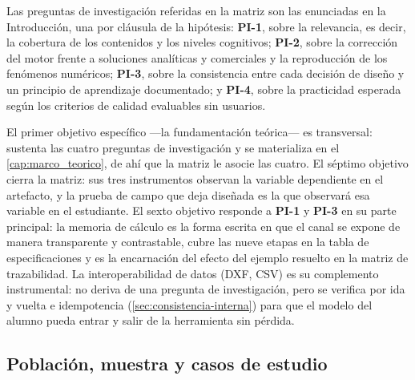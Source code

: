 Las preguntas de investigación referidas en la matriz son las enunciadas en la Introducción, una por cláusula de la hipótesis: \textbf{PI-1}, sobre la relevancia, es decir, la cobertura de los contenidos y los niveles cognitivos; \textbf{PI-2}, sobre la corrección del motor frente a soluciones analíticas y comerciales y la reproducción de los fenómenos numéricos; \textbf{PI-3}, sobre la consistencia entre cada decisión de diseño y un principio de aprendizaje documentado; y \textbf{PI-4}, sobre la practicidad esperada según los criterios de calidad evaluables sin usuarios.

El primer objetivo específico —la fundamentación teórica— es transversal: sustenta las cuatro preguntas de investigación y se materializa en el \autoref{cap:marco_teorico}, de ahí que la matriz le asocie las cuatro. El séptimo objetivo cierra la matriz: sus tres instrumentos observan la variable dependiente en el artefacto, y la prueba de campo que deja diseñada es la que observará esa variable en el estudiante. El sexto objetivo responde a \textbf{PI-1} y \textbf{PI-3} en su parte principal: la memoria de cálculo es la forma escrita en que el canal se expone de manera transparente y contrastable, cubre las nueve etapas en la tabla de especificaciones y es la encarnación del efecto del ejemplo resuelto en la matriz de trazabilidad. La interoperabilidad de datos (DXF, CSV) es su complemento instrumental: no deriva de una pregunta de investigación, pero se verifica por ida y vuelta e idempotencia (\autoref{sec:consistencia-interna}) para que el modelo del alumno pueda entrar y salir de la herramienta sin pérdida.

\subsection{Población, muestra y casos de estudio}
\label{sec:poblacion}

